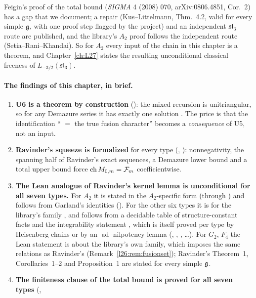 Feigin's proof of the total bound (\emph{SIGMA} 4 (2008) 070, arXiv:0806.4851, Cor.~2) has a gap that we document; a repair
(Kus--Littelmann, Thm.~4.2, valid for every simple $\mathfrak g$, with one proof step flagged by the project) and an independent
$\mathfrak{sl}_3$ route are published, and the library's $A_2$ proof follows the independent route (Setia--Rani--Khandai). So for $A_2$ every input of
the chain in this chapter is a theorem, and Chapter~\ref{ch:L27} states the resulting unconditional classical freeness of
$L_{-3/2}(\mathfrak{sl}_3)$.

\paragraph{The findings of this chapter, in brief.}
\begin{enumerate}
\item \textbf{U6 is a theorem by construction} (): the mixed recursion is
  unitriangular, so for any Demazure series it has exactly one solution . The price is that the
  identification `` $=$ the true fusion character'' becomes a \emph{consequence} of U5, not an input.
\item \textbf{Ravinder's squeeze is formalized} for every type (, ): nonnegativity, the
  spanning half of Ravinder's exact sequences, a Demazure lower bound and a total upper bound force
  $\mathrm{ch}\,M_{0,m}=\mathcal F_m$ coefficientwise.
\item \textbf{The Lean analogue of Ravinder's kernel lemma is unconditional for all seven types.} For $A_2$ it is
  stated in the $A_2$-specific form  (through ) and follows from Garland's
  identities (). For the other six types it is  for the library's family
  , and follows from a decidable table of structure-constant facts and the
  integrability statement , which is itself proved per type by Heisenberg chains or by an
  $\operatorname{ad}$-nilpotency lemma (, ,
  , \dots). For $G_2$, $F_4$ the Lean statement is about the library's own family, which imposes the same relations
  as Ravinder's (Remark~\ref{l26:rem:fusionset}); Ravinder's Theorem~1, Corollaries~1--2 and Proposition~1 are stated
  for every simple $\mathfrak g$.
\item \textbf{The finiteness clause of the total bound is proved for all seven types} (,

\end{enumerate}
